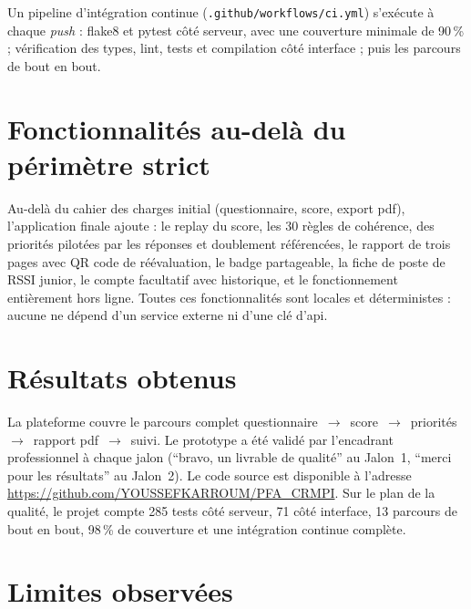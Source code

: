 Un pipeline d'intégration continue (\texttt{.github/workflows/ci.yml}) s'exécute à chaque \textit{push} : flake8 et pytest côté serveur, avec une couverture minimale de 90\,\% ; vérification des types, lint, tests et compilation côté interface ; puis les parcours de bout en bout.


\section{Fonctionnalités au-delà du périmètre strict}
\label{sec:bonus}

Au-delà du cahier des charges initial (questionnaire, score, export \gls{pdf}), l'application finale ajoute : le replay du score, les 30 règles de cohérence, des priorités pilotées par les réponses et doublement référencées, le rapport de trois pages avec QR code de réévaluation, le badge partageable, la fiche de poste de RSSI junior, le compte facultatif avec historique, et le fonctionnement entièrement hors ligne. Toutes ces fonctionnalités sont locales et déterministes : aucune ne dépend d'un service externe ni d'une clé d'\gls{api}.

\section{Résultats obtenus}
\label{sec:resultats}

La plateforme couvre le parcours complet questionnaire~$\rightarrow$~score~$\rightarrow$~priorités~$\rightarrow$~rapport \gls{pdf}~$\rightarrow$~suivi. Le prototype a été validé par l'encadrant professionnel à chaque jalon (\enquote{bravo, un livrable de qualité} au Jalon~1, \enquote{merci pour les résultats} au Jalon~2). Le code source est disponible à l'adresse \url{https://github.com/YOUSSEFKARROUM/PFA_CRMPI}. Sur le plan de la qualité, le projet compte 285 tests côté serveur, 71 côté interface, 13 parcours de bout en bout, 98\,\% de couverture et une intégration continue complète.

\section{Limites observées}
\label{sec:limites}

